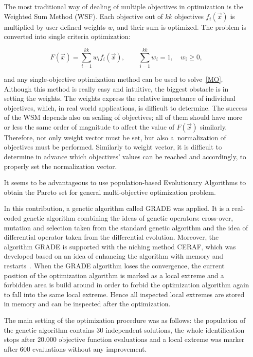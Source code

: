 \documentclass[review]{myarticle}
\newenvironment{lineq}
    {\begin{linenomath*}
    \begin{equation}
    }
    { 
    \end{equation} 
    \end{linenomath*}
    }
\begin{document}
The most traditional way of dealing of multiple objectives in optimization is the Weighted Sum Method (WSF). Each objective out of $kk$ objectives $f_i(\vec{x})$ is multiplied by user defined weights $w_i$ and their sum is optimized. The problem is converted into single criteria optimization:
%
\begin{lineq}\label{MO}
    F(\vec{x}) = \sum_{i=1}^{kk} w_i f_i(\vec{x}) , \quad\quad \sum_{i=1}^{kk} w_i = 1, \quad w_i \ge 0 ,
\end{lineq}
and any single-objective optimization method can be used to solve~\eqref{MO}. Although this method is really easy and intuitive, the biggest obstacle is in setting the weights. The weights express the relative importance of individual objectives, which, in real world applications, is difficult to determine. The success of the WSM depends also on scaling of objectives; all of them should have more or less the same order of magnitude to affect the value of $F(\vec{x})$ similarly. Therefore, not only weight vector must be set, but also a~normalization of objectives must be performed. Similarly to weight vector, it is difficult to determine in advance which objectives' values can be reached and accordingly, to properly set the normalization vector.

It seems to be advantageous to use population-based Evolutionary Algorithms to obtain the Pareto set for general multi-objective optimization problem.

In this contribution, a genetic algorithm called GRADE \citep{grade,Kucerova:2007:PHD} was applied. It is a real-coded genetic algorithm combining the ideas of genetic operators: cross-over, mutation and selection taken from the
standard genetic algorithm and the idea of differential operator taken from the differential evolution.
Moreover, the algorithm GRADE is supported with the niching method
CERAF, which was developed based on an idea of enhancing the algorithm with
memory and restarts~\citep{ceraf}. When the GRADE algorithm loses the convergence, the current position of the optimization algorithm is marked as a local extreme and a forbidden area is build around in order to forbid the optimization algorithm again to fall into the same local extreme. Hence all inspected local extremes are stored in memory and can be inspected after the optimization. 

The main setting of the optimization procedure was as follows: the population of the genetic algorithm contains 30 independent solutions, the whole identification stops after 20.000 objective function evaluations and a local extreme was marker after 600 evaluations without any improvement.
\end{document}
